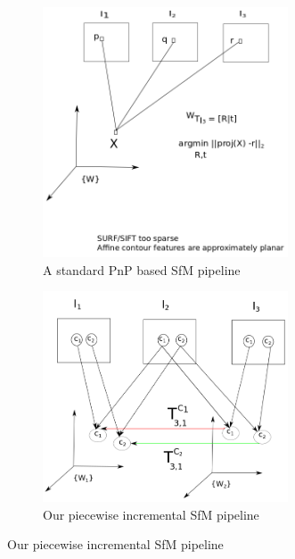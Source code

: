 \begin{figure}[!htbp]
\centering
\begin{subfigure}[t]{0.8\textwidth}
    \includegraphics[width=0.8\textwidth]{figures/isfm/standardSFM.png}
\caption{A standard PnP based SfM pipeline}
\label{fig:standardsfm}
\end{subfigure}\quad \begin{subfigure}[t]{0.8\textwidth}
    \includegraphics[width=0.8\textwidth]{figures/isfm/OurSFM.png}
        \caption{Our piecewise incremental SfM pipeline}
        \label{fig:oursfm}
        \end{subfigure}
        

\end{figure}
